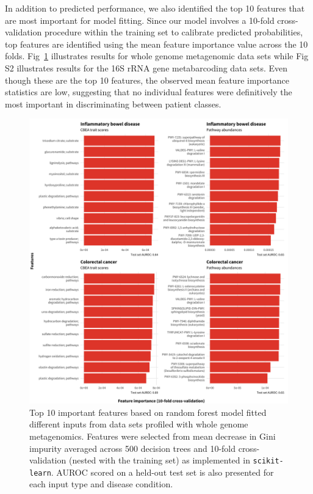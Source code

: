 \documentclass[10pt,letterpaper]{article}
\begin{document}
In addition to predicted performance, we also identified the top 10 features that are most important for model fitting. Since our model involves a 10-fold cross-validation procedure within the training set to calibrate predicted probabilities, top features are identified using the mean feature importance value across the 10 folds. Fig~\ref{fig:4} illustrates results for whole genome metagenomic data sets while Fig S2 illustrates results for the 16S rRNA gene metabarcoding data sets. Even though these are the top 10 features, the observed mean feature importance statistics are low, suggesting that no individual features were definitively the most important in discriminating between patient classes.  

\begin{figure}[!h]
\includegraphics[width=0.99\linewidth]{figures/feat_importance_wgs.png}
\caption{Top 10 important features based on random forest model fitted different inputs from data sets profiled with whole genome metagenomics. Features were selected from mean decrease in Gini impurity averaged across 500 decision trees and 10-fold cross-validation (nested with the training set) as implemented in \texttt{scikit-learn}. AUROC scored on a held-out test set is also presented for each input type and disease condition.}
\label{fig:4}
\end{figure}
\end{document}
